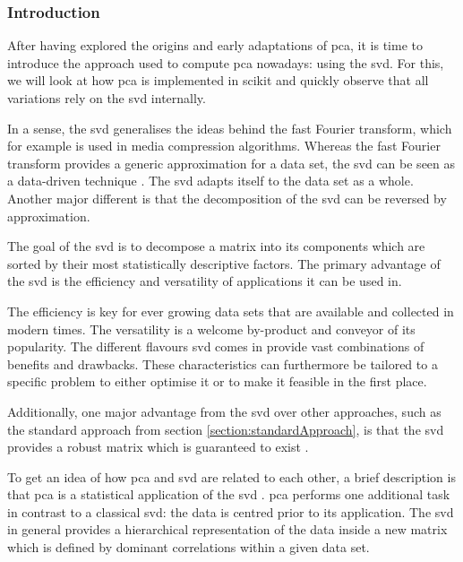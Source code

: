 \subsubsection{Introduction}

After having explored the origins and early adaptations of \gls{pca}, it is time to introduce the approach used to compute \gls{pca} nowadays: using the \acrlong{svd}.
For this, we will look at how \gls{pca} is implemented in \gls{scikit} and quickly observe that all variations rely on the \gls{svd} internally.\bigskip


In a sense, the \gls{svd} generalises the ideas behind the fast Fourier transform, which for example is used in media compression algorithms. 
Whereas the fast Fourier transform provides a generic approximation for a data set, the \gls{svd} can be seen as a data-driven technique \cite{brunton2019data}.
The \gls{svd} adapts itself to the data set as a whole.
Another major different is that the decomposition of the \gls{svd} can be reversed by approximation.
\bigskip


The goal of the \gls{svd} is to decompose a matrix into its components which are sorted by their most statistically descriptive factors.
The primary advantage of the \gls{svd} is the efficiency and versatility of applications it can be used in.

The efficiency is key for ever growing data sets that are available and collected in modern times.
The versatility is a welcome by-product and conveyor of its popularity.
The different flavours \gls{svd} comes in provide vast combinations of benefits and drawbacks.
These characteristics can furthermore be tailored to a specific problem to either optimise it or to make it feasible in the first place.

Additionally, one major advantage from the \gls{svd} over other approaches, such as the standard approach from section \ref{section:standardApproach}, is that the \gls{svd} provides a robust matrix which is guaranteed to exist \cite{brunton2019data}.\bigskip



To get an idea of how \gls{pca} and \gls{svd} are related to each other, a brief description is that \gls{pca} is a statistical application of the \gls{svd} \cite{brunton2019data}.
\Gls{pca} performs one additional task in contrast to a classical \gls{svd}: the data is centred prior to its application.
The \gls{svd} in general provides a hierarchical representation of the data inside a new matrix which is defined by dominant correlations within a given data set.
\bigskip



